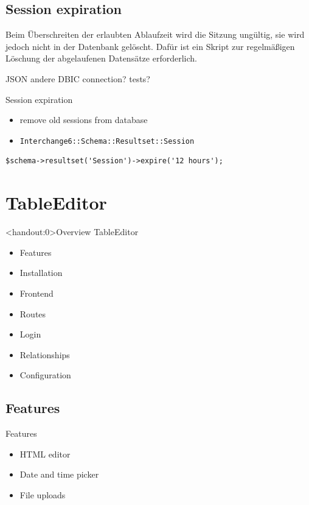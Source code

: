 \subsection{Session expiration}

Beim Überschreiten der erlaubten Ablaufzeit wird die Sitzung
ungültig, sie wird jedoch nicht in der Datenbank gelöscht.
Dafür ist ein Skript zur regelmäßigen Löschung der
abgelaufenen Datensätze erforderlich.

JSON
andere DBIC connection?
tests?

\begin{frame}[fragile]{Session expiration}
\begin{itemize}
\item remove old sessions from database
\item \verb|Interchange6::Schema::Resultset::Session|
\end{itemize}
\begin{lstlisting}
$schema->resultset('Session')->expire('12 hours');
\end{lstlisting}
\end{frame}

\section{TableEditor}

\begin{frame}<handout:0>{Overview TableEditor}
\begin{itemize}
\item Features
\item Installation
\item Frontend
\item Routes
\item Login
\item Relationships
\item Configuration
\end{itemize}
\end{frame}

\subsection{Features}
\begin{frame}{Features}
\begin{itemize}
\item HTML editor
\item Date and time picker
\item File uploads
\end{itemize}
\end{frame}

